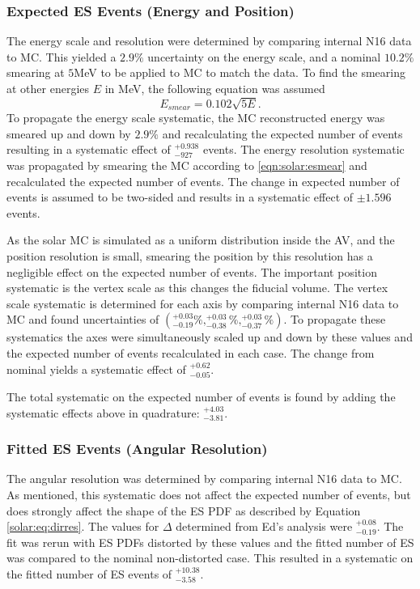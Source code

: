 \subsubsection{Expected ES Events (Energy and Position)}

The energy scale and resolution were determined by comparing 
internal N16 data to MC. This yielded a $2.9\%$ uncertainty on the energy
scale, and a nominal $10.2\%$ smearing at $5$MeV to be applied to MC to match
the data.
To find the smearing at other energies $E$ in MeV, the following equation was 
assumed
\begin{equation}
\label{eqn:solar:esmear}
E_{smear} = 0.102\sqrt{5 E}.
\end{equation}
To propagate the energy scale systematic, the MC reconstructed energy was 
smeared up and down by $2.9\%$ and recalculating the expected number of events
resulting in  a systematic effect of $^{+0.938}_{-927}$ events. 
The energy resolution systematic was propagated by smearing the MC according to
\ref{eqn:solar:esmear} and recalculated the expected number of events.
The change in expected number of events is assumed to be two-sided and results
in a systematic effect of $\pm1.596$ events.

As the solar MC is simulated as a uniform distribution inside the AV, and the
position resolution is small, smearing the position by this resolution has a 
negligible effect on the expected number of events.
The important position systematic is the vertex scale as this changes the 
fiducial volume.
The vertex scale systematic is determined for each axis by comparing
internal N16 data to MC and found uncertainties of
$(^{+0.03}_{-0.19}\%,^{+0.03}_{-0.38}\%,^{+0.03}_{-0.37}\%)$.
To propagate these systematics the axes were simultaneously scaled up and down
by these values and the expected number of events recalculated in each case.
The change from nominal yields a systematic effect of $^{+0.62}_{-0.05}$.

The total systematic on the expected number of events is found by adding the
systematic effects above in quadrature: $^{+4.03}_{-3.81}$.

\subsubsection{Fitted ES Events (Angular Resolution)}

The angular resolution was determined by comparing internal N16 
data to MC. As mentioned, this systematic does not affect the expected 
number of events, but does strongly affect the shape of the ES PDF as 
described by Equation \ref{solar:eq:dirres}.
The values for $\Delta$ determined from Ed's analysis were $^{+0.08}_{-0.19}$.
The fit was rerun with ES PDFs distorted by these values and the fitted 
number of ES was compared to the nominal non-distorted case.
This resulted in a systematic on the fitted number of ES events of 
$^{+10.38}_{-3.58}$.

